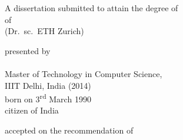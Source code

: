 \begin{titlepage}
    \begin{center}
        \large
        \begingroup
        \endgroup

        \hfill

        \vfill

        \begingroup
            \spacedallcaps{\myTitle}
        \endgroup

        \vfill

        \begingroup
            A dissertation submitted to attain the degree of\\
            \vspace{0.5em}
            of
             \\
            (Dr.\ sc.\ ETH Zurich)
        \endgroup

        \vfill

        \begingroup
            presented by\\
            \vspace{0.5em}
            \spacedallcaps{\myName}\\\vspace{0.5em}
            Master of Technology in Computer Science,\\ IIIT Delhi, India (2014)\\
            \vspace{0.5em}
            born on 3\textsuperscript{rd} March 1990\\
            citizen of India
        \endgroup

        \vfill

        \begingroup
            accepted on the recommendation of\\
            \vspace{0.5em}
        \endgroup

        \vfill

        \myTime%

        \vfill
    \end{center}
\end{titlepage}
